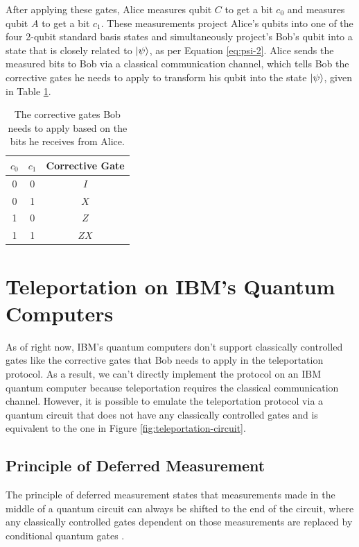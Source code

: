 \documentclass[prx,twocolumn]{revtex4-2}
\numberwithin{equation}{section}
\numberwithin{figure}{section}
\numberwithin{table}{section}
\begin{document}
After applying these gates, Alice measures qubit $C$ to get a bit $c_0$ and measures qubit $A$ to get a bit 
$c_1$. These measurements project Alice's qubits into one of the four 2-qubit standard basis states and
simultaneously project's Bob's qubit into a state that is closely related to $\ket\psi$, as per Equation 
\ref{eq:psi-2}. Alice sends the measured bits to Bob via a classical communication channel, which tells Bob 
the corrective gates he needs to apply to transform his qubit into the state $\ket\psi$, given in Table 
\ref{tab:corrective-gates}.

\begin{table}[h]
    \centering
    \begin{tabular}{|c|c||c|}
        \hline 
        $c_0$ & $c_1$ & Corrective Gate \\ \hline \hline 
        0 & 0 & $I$ \\ \hline
        0 & 1 & $X$ \\ \hline
        1 & 0 & $Z$ \\ \hline
        1 & 1 & $ZX$ \\ \hline
    \end{tabular}
    \caption{The corrective gates Bob needs to apply based on the bits he receives from Alice.}
    \label{tab:corrective-gates}
\end{table}

\section{Teleportation on IBM's Quantum Computers}
As of right now, IBM's quantum computers don't support classically controlled gates \cite{Qiskit-Textbook} 
like the corrective gates that Bob needs to apply in the teleportation protocol. As a result, we can't
directly implement the protocol on an IBM quantum computer because teleportation requires the classical 
communication channel. However, it is possible to emulate the teleportation protocol via a quantum circuit 
that does not have any classically controlled gates and is equivalent to the one in 
Figure \ref{fig:teleportation-circuit}.
\subsection{Principle of Deferred Measurement}
The principle of deferred measurement states that measurements made in the middle of a quantum circuit can 
always be shifted to the end of the circuit, where any classically controlled gates dependent on those 
measurements are replaced by conditional quantum gates \cite{nielsen-chuang}.
\end{document}
